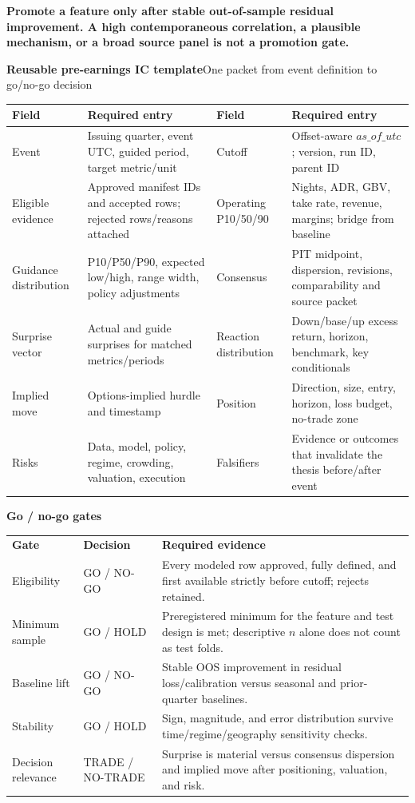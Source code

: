 \documentclass[10pt,letterpaper]{article}
\newcommand{\PageTitle}[2]{%
  {\color{ICNavy}\fontsize{16}{18}\selectfont\bfseries #1}\hfill{\color{ICMuted}\scriptsize #2}\par
  \vspace{2pt}{\color{ICNavy}\rule{\textwidth}{1.25pt}}\vspace{4pt}
}
\newcommand{\SmallSection}[1]{{\color{ICNavy}\bfseries #1}\par}
\newcommand{\Callout}[2]{%
  \colorbox{#1!9}{\parbox{0.965\textwidth}{\vspace{3pt}\textcolor{#1}{\bfseries #2}\vspace{3pt}}}
}
\begin{document}
\Callout{ICNavy}{Promote a feature only after stable out-of-sample residual improvement. A high contemporaneous correlation, a plausible mechanism, or a broad source panel is not a promotion gate.}

\clearpage

\PageTitle{Reusable pre-earnings IC template}{One packet from event definition to go/no-go decision}

{\fontsize{6.75}{8.05}\selectfont
\begin{tabularx}{\textwidth}{p{} p{} p{} Y}
\toprule
{}Field & Required entry & Field & Required entry \\
\midrule
Event & Issuing quarter, event UTC, guided period, target metric/unit & Cutoff & Offset-aware $as\_of\_utc$; version, run ID, parent ID \\
Eligible evidence & Approved manifest IDs and accepted rows; rejected rows/reasons attached & Operating P10/50/90 & Nights, ADR, GBV, take rate, revenue, margins; bridge from baseline \\
Guidance distribution & P10/P50/P90, expected low/high, range width, policy adjustments & Consensus & PIT midpoint, dispersion, revisions, comparability and source packet \\
Surprise vector & Actual and guide surprises for matched metrics/periods & Reaction distribution & Down/base/up excess return, horizon, benchmark, key conditionals \\
Implied move & Options-implied hurdle and timestamp & Position & Direction, size, entry, horizon, loss budget, no-trade zone \\
Risks & Data, model, policy, regime, crowding, valuation, execution & Falsifiers & Evidence or outcomes that invalidate the thesis before/after event \\
\bottomrule
\end{tabularx}}

\SmallSection{Go / no-go gates}
\begin{tabularx}{\textwidth}{p{} p{} Y}
\textbf{Gate} & \textbf{Decision} & \textbf{Required evidence} \\
Eligibility & GO / NO-GO & Every modeled row approved, fully defined, and first available strictly before cutoff; rejects retained. \\
Minimum sample & GO / HOLD & Preregistered minimum for the feature and test design is met; descriptive $n$ alone does not count as test folds. \\
Baseline lift & GO / NO-GO & Stable OOS improvement in residual loss/calibration versus seasonal and prior-quarter baselines. \\
Stability & GO / HOLD & Sign, magnitude, and error distribution survive time/regime/geography sensitivity checks. \\
Decision relevance & TRADE / NO-TRADE & Surprise is material versus consensus dispersion and implied move after positioning, valuation, and risk. \\
\end{tabularx}
\end{document}
